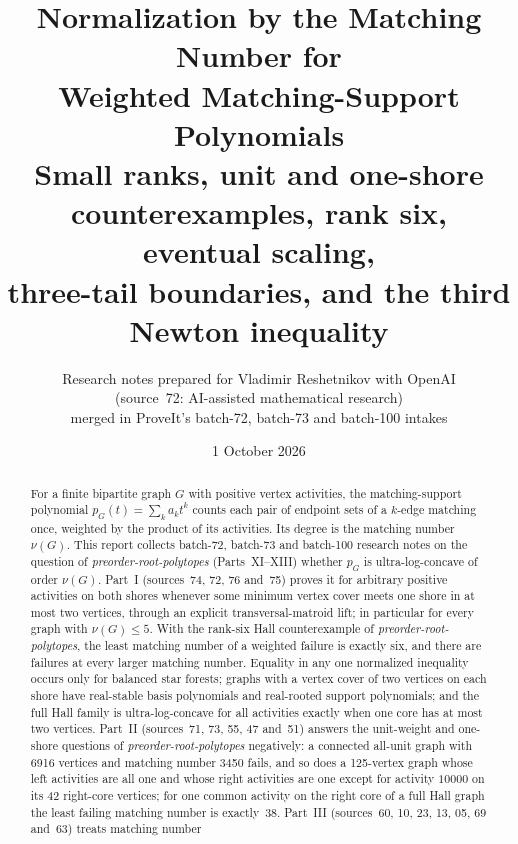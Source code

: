 \documentclass[11pt,a4paper]{article}
\theoremstyle{remark}\newtheorem{remark}[theorem]{Remark}
\newcommand{\prp}{\emph{preorder-root-polytopes}}
\begin{document}
\title{Normalization by the Matching Number for\\Weighted Matching-Support Polynomials\\[4pt]
\large Small ranks, unit and one-shore counterexamples, rank six, eventual scaling,\\ three-tail boundaries, and the third Newton inequality}
\author{Research notes prepared for Vladimir Reshetnikov with OpenAI\\
(source~72: AI-assisted mathematical research)\\[2pt]
\small merged in ProveIt's batch-72, batch-73 and batch-100 intakes}
\date{1 October 2026}
\maketitle

\begin{abstract}
For a finite bipartite graph $G$ with positive vertex activities, the
matching-support polynomial $p_G(t)=\sum_k a_kt^k$ counts each pair of
endpoint sets of a $k$-edge matching once, weighted by the product of its
activities. Its degree is the matching number $\nu(G)$. This report collects
batch-72, batch-73 and batch-100 research notes on the question of
\prp{} (Parts~XI--XIII) whether $p_G$ is ultra-log-concave of order
$\nu(G)$.
Part~I (sources~74, 72, 76 and~75) proves it for arbitrary positive
activities on both shores whenever some minimum vertex cover meets one shore
in at most two vertices, through an explicit transversal-matroid lift; in
particular for every graph with $\nu(G)\le5$. With the rank-six Hall
counterexample of \prp, the least matching number of a weighted failure
is exactly six, and there are failures at every larger matching number.
Equality in any one normalized inequality occurs only for balanced star
forests; graphs with a vertex cover of two vertices on each shore have
real-stable basis polynomials and real-rooted support polynomials; and the
full Hall family is ultra-log-concave for all activities exactly when one
core has at most two vertices.
Part~II (sources~71, 73, 55, 47 and~51) answers the unit-weight and
one-shore questions of \prp{} negatively: a connected all-unit graph
with 6916 vertices and matching number 3450 fails, and so does a
125-vertex graph whose left activities are all one and whose right
activities are one except for activity $10000$ on its 42 right-core
vertices; for one common activity on the right core of a full Hall graph
the least failing matching number is exactly~38.
Part~III (sources~60, 10, 23, 13, 05, 69 and~63) treats matching number

\end{abstract}
\end{document}
